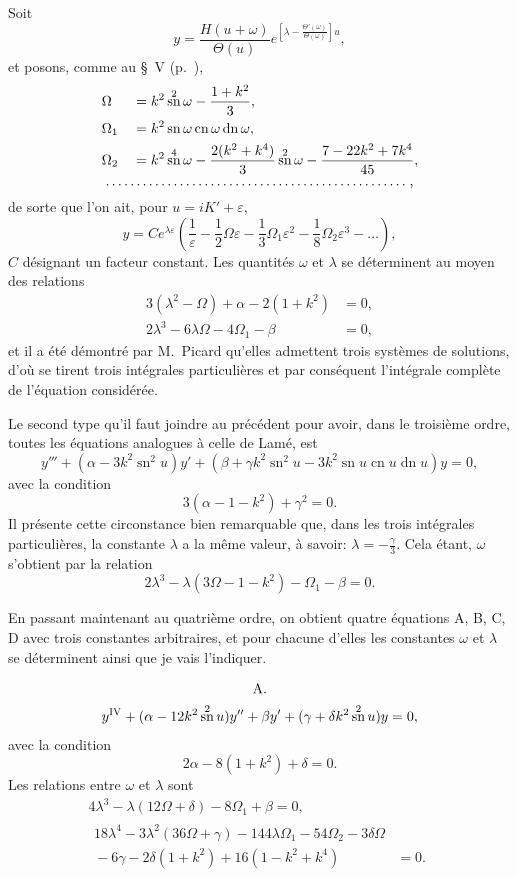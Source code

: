 \documentclass[11pt,leqno,oneside,letterpaper]{book}[2005/09/16]
\DeclareMathOperator{\sn}{sn}
\DeclareMathOperator{\cn}{cn}
\DeclareMathOperator{\dn}{dn}
\newcommand{\dotfillalignat}{\multispan{4}{\dotfill}}
\begin{document}
Soit
\[
y = \frac{H(u + \omega)}{\Theta(u)}
    e^{ \left[ \lambda - \frac{\Theta'(\omega)}{\Theta(\omega)} \right] u},
\]
et posons, comme au \S~V (p.~\pageref{page13a}),
\begin{alignat*}{2}
&\Omega   &&= k^2 \sn^2 \omega - \dfrac{1 + k^2}{3},  \\
&\Omega_1 &&= k^2 \sn \omega \cn \omega \dn \omega, \\
&\Omega_2 &&= k^2 \sn^4 \omega - \frac{2(k^2 + k^4)}{3} \sn^2 \omega - \frac{ 7 - 22k^2 + 7k^4 }{45}, \\
\dotfillalignat,
\end{alignat*}
de sorte que l'on ait, pour $u = iK' + \varepsilon$,
\[
y = Ce^{\lambda \varepsilon} \left( \frac{1}{\varepsilon}
    - \frac{1}{2} \Omega   \varepsilon
    - \frac{1}{3} \Omega_1 \varepsilon^2
    - \frac{1}{8} \Omega_2 \varepsilon^3 - \ldots \right),
\]
$C$ d\'esignant un facteur constant. Les quantit\'es $\omega$ et $\lambda$ se d\'eterminent au
moyen des relations
\begin{align*}
3(\lambda^2 - \Omega) + \alpha - 2(1 + k^2)     &= 0,  \\
2\lambda^3 - 6\lambda\Omega - 4\Omega_1 - \beta &= 0,
\end{align*}
et il a \'et\'e d\'emontr\'e par M.~Picard qu'elles admettent trois syst\`emes de
solutions, d'o\`u se tirent trois int\'egrales particuli\`eres et par cons\'equent
l'int\'egrale compl\`ete de l'\'equation consid\'er\'ee.

Le second type qu'il faut joindre au pr\'ec\'edent pour avoir, dans le
trois\-i\`eme ordre, toutes les \'equations analogues \`a celle de Lam\'e, est
\[
y''' + (\alpha - 3k^2 \sn^2 u)y' +
  (\beta + \gamma k^2 \sn^2 u - 3k^2 \sn u \cn u \dn u) y = 0,
\]
avec la condition
\[
3(\alpha - 1 - k^2) + \gamma^2 = 0.
\]
Il pr\'esente cette circonstance bien remarquable que, dans les trois
int\'egrales particuli\`eres, la constante $\lambda$ a la m\^eme valeur, \`a savoir: $\lambda = -\frac{\gamma}{3}$.
Cela \'etant, $\omega$ s'obtient par la relation
\[
2\lambda^3-\lambda(3\Omega-1-k^2)-\Omega_1-\beta = 0.
\]

En passant maintenant au quatri\`eme ordre, on obtient quatre \'equations
A, B, C, D avec trois constantes arbitraires, et pour chacune d'elles
les constantes $\omega$ et $\lambda$ se d\'eterminent ainsi que je vais l'indiquer.

\begin{gather*}
\text{A.} \\
y^{\textsc{IV}} + (\alpha-12k^2 \sn^2 u)y'' + \beta y' + (\gamma+\delta k^2\sn^2 u)y = 0,
\end{gather*}
avec la condition
\[
2\alpha - 8(1+k^2)+\delta = 0.
\]
Les relations entre $\omega$ et $\lambda$ sont
\begin{gather*}
4\lambda^3-\lambda(12\Omega+\delta)-8\Omega_1+\beta = 0, \\
\begin{split}
18\lambda^4-3\lambda^2(36\Omega + \gamma)-144\lambda\Omega_1-54\Omega_2-3\delta\Omega \\
{}-6\gamma-2\delta(1+k^2)+16(1-k^2+k^4) &= 0.
\end{split}
\end{gather*}
\end{document}
